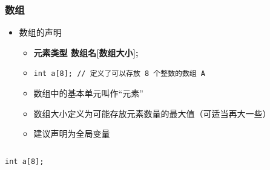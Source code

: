 \begin{frame}[fragile]
    \frametitle{数组}

    \begin{overlayarea}{\textwidth}{.55\textheight}
        \begin{itemize}
            \item<1-> 数组的声明

                \begin{itemize}
                    \item \textbf{元素类型 \enspace 数组名[数组大小];}
                    \item \lstinline|int a[8]; // 定义了可以存放 8 个整数的数组 A|
                \end{itemize}

                \begin{itemize}
                    \item<2-> 数组中的基本单元叫作“元素”
                    \item<2-> 数组大小定义为可能存放元素数量的最大值（可适当再大一些）
                \end{itemize}

                \begin{itemize}
                    \item<3-> 建议声明为全局变量
                \end{itemize}
        \end{itemize}
    \end{overlayarea}

    \begin{columns}

        \lstinline|int a[8];|

    \end{columns}
\end{frame}

